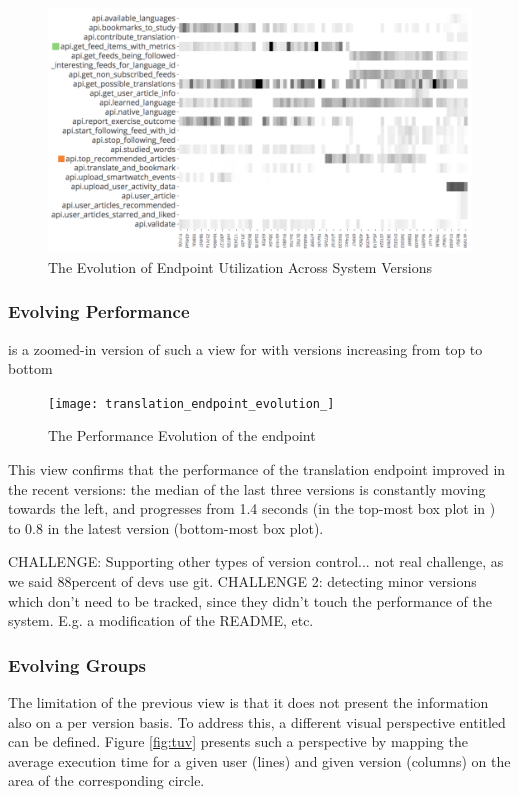     \begin{figure}[h!]
      \centering
      \includegraphics[width=0.9\linewidth]{utilization-evolution}
      \caption{The Evolution of Endpoint Utilization Across System Versions}
      \label{fig:mv-util}
    \end{figure}


    \subsubsection*{Evolving Performance}

     is a zoomed-in version of such a view for \epTranslations with versions increasing from top to bottom

    \begin{figure}[h!]
      \centering
      \texttt{[image: translation\_endpoint\_evolution\_]}
      \caption{The Performance Evolution of the \epTranslations endpoint}
      \label{fig:tee}
    \end{figure}


  This view confirms that the performance of the translation endpoint improved in the recent versions: the median of the last three versions is constantly moving towards the left, and progresses from 1.4 seconds (in the top-most box plot in ) to 0.8 in the latest version (bottom-most box plot).



  CHALLENGE: Supporting other types of version control... not real challenge, as we said 88percent of devs use git. 
  CHALLENGE 2: detecting minor versions which don't need to be tracked, since they didn't touch the performance of the system. E.g. a modification of the README, etc. 
  


\subsubsection*{Evolving Groups}
The limitation of the previous view is that it does not present the information also on a per version basis. To address this, a different visual perspective entitled  can be defined. Figure \ref{fig:tuv} presents such a perspective by mapping the average execution time for a given user (lines) and given version (columns) on the area of the corresponding circle. 

